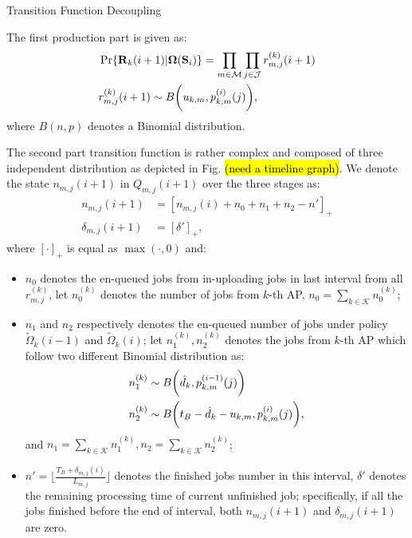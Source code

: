 \documentclass[10pt, conference, letterpaper]{IEEEtran}
\renewcommand{\vec}{\mathbf}
\DeclarePairedDelimiter{\Paren}{\bigg(}{\bigg)}
\newcommand{\apSet}{\mathcal{K}}
\newcommand{\esSet}{\mathcal{M}}
\newcommand{\jSpace}{\mathcal{J}}
\newcommand{\Stat}{\mathbf{S}}
\newcommand{\Policy}{\mathbf{\Omega}}
\begin{document}
    \appendices

    \begin{section}{Transition Function Decoupling}
        \label{trans-decouple}

        The first production part is given as:
        \begin{align*}
            &\Pr\{\vec{R}_k(i+1)|\Policy(\Stat_i)\} = \prod_{m\in\esSet}\prod_{j\in\jSpace} r^{(k)}_{m,j}(i+1)
            \\
            &r^{(k)}_{m,j}(i+1) \sim B\Paren{u_{k,m},p^{(i)}_{k,m}(j)},
        \end{align*}
        where $B(n,p)$ denotes a Binomial distribution.
            
        The second part transition function is rather complex and composed of three independent distribution as depicted in Fig. \hl{(need a timeline graph)}. We denote the state $n_{m,j}(i+1)$ in $Q_{m,j}(i+1)$ over the three stages as:
        \begin{align*}
            n_{m,j}(i+1) &= [n_{m,j}(i) + n_0 + n_1 + n_2 -n']_+
            \\
            \delta_{m,j}(i+1) &= [\delta']_+,
        \end{align*}
        where $[\cdot]_+$ is equal as $\max(\cdot, 0)$ and:
        \begin{itemize}
            \item $n_0$ denotes the en-queued jobs from in-uploading jobs in last interval from all $r^{(k)}_{m,j}$, let $n^{(k)}_0$ denotes the number of jobs from $k$-th AP, $n_0 = \sum_{k\in\apSet} n^{(k)}_0$;
            \item $n_1$ and $n_2$ respectively denotes the en-queued number of jobs under policy $\tilde{\Omega}_k(i-1)$ and $\tilde{\Omega}_k(i)$; let $n^{(k)}_1, n^{(k)}_2$ denotes the jobs from $k$-th AP which follow two different Binomial distribution as:
            \begin{align*}
                n^{(k)}_1 &\sim B\Paren{\hat{d}_k, p^{(i-1)}_{k,m}(j)}
                \\
                n^{(k)}_2 &\sim B\Paren{t_B - \hat{d}_k - u_{k,m}, p^{(i)}_{k,m}(j)},
            \end{align*}
            and $n_1 = \sum_{k\in\apSet}n^{(k)}_1, n_2=\sum_{k\in\apSet}n^{(k)}_2$;
            \item $n' = \lfloor\frac{T_B+\delta_{m,j}(i)}{L_{m,j}}\rfloor$ denotes the finished jobs number in this interval, $\delta'$ denotes the remaining processing time of current unfinished job; specifically, if all the jobs finished before the end of interval, both $n_{m,j}(i+1)$ and $\delta_{m,j}(i+1)$ are zero.

\end{itemize}
\end{section}
\end{document}
